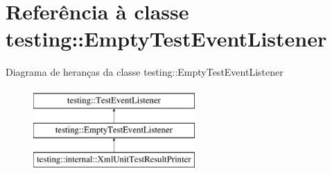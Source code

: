 \hypertarget{classtesting_1_1EmptyTestEventListener}{\section{Referência à classe testing\-:\-:Empty\-Test\-Event\-Listener}
\label{classtesting_1_1EmptyTestEventListener}
}
Diagrama de heranças da classe testing\-:\-:Empty\-Test\-Event\-Listener\begin{figure}[H]
\begin{center}
\leavevmode
\includegraphics[height=3.000000cm]{classtesting_1_1EmptyTestEventListener}
\end{center}
\end{figure}
